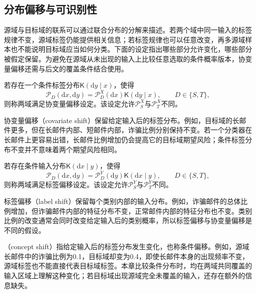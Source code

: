 \subsection{分布偏移与可识别性}
\label{sec:distribution-shift}

源域与目标域的联系可以通过联合分布的分解来描述。若两个域中同一输入的标签规律不变，源域标签仍能提供相关信息；若标签规律也可以任意改变，再多源域样本也不能说明目标域应当如何分类。下面的设定指出哪些部分允许变化，哪些部分被假定保留。为避免在源域从未出现的输入上比较任意选取的条件概率版本，协变量偏移还需与后文的覆盖条件结合使用。

\begin{definition}[协变量偏移]
\label{def:covariate-shift}
若存在一个条件标签分布$\mathsf K(\mathrm dy\mid x)$，使得
\[
 \mathcal P_D(\mathrm dx,\mathrm dy)
 =\mathcal P_D^X(\mathrm dx)\mathsf K(\mathrm dy\mid x),
 \qquad D\in\{S,T\},
\]
则称两域满足协变量偏移设定。该设定允许$\mathcal P_S^X$与$\mathcal P_T^X$不同。
\end{definition}

协变量偏移（covariate shift）保留给定输入后的标签分布。例如，目标域的长邮件更多，但在长邮件内部、短邮件内部，诈骗比例分别保持不变。若一个分类器在长邮件上更容易出错，长邮件比例增加仍会提高它的目标域期望风险；条件标签分布不变并不意味着两个期望风险相同。

\begin{definition}[标签偏移]
\label{def:label-shift}
若存在条件输入分布$\mathsf K(\mathrm dx\mid y)$，使得
\[
 \mathcal P_D(\mathrm dx,\mathrm dy)
 =\mathcal P_D^Y(\mathrm dy)\mathsf K(\mathrm dx\mid y),
 \qquad D\in\{S,T\},
\]
则称两域满足标签偏移设定。该设定允许$\mathcal P_S^Y$与$\mathcal P_T^Y$不同。
\end{definition}

标签偏移（label shift）保留每个类别内部的输入分布。例如，诈骗邮件的总体比例增加，但诈骗邮件内部的特征分布不变，正常邮件内部的特征分布也不变。类别比例的改变通常会同时改变给定输入后的类别概率，所以标签偏移与协变量偏移是不同的假设。

（concept shift）指给定输入后的标签分布发生变化，也称条件偏移。例如，源域长邮件中的诈骗比例为0.1，目标域却变为0.4，即使长邮件本身的出现频率不变，源域标签也不能直接代表目标域标签。本章比较条件分布时，均在两域共同覆盖的输入区域上理解这种变化；若目标域出现源域完全未覆盖的输入，还存在额外的信息缺失。

